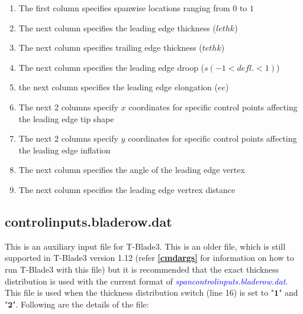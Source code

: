 \documentclass[8pt]{article}
\begin{document}
\begin{itemize}[leftmargin=*]
\begin{enumerate}[label=\alph*]
        \item The first column specifies spanwise locations ranging from $0$ to $1$
        \item The next column specifies the leading edge thickness ($lethk$)
        \item The next column specifies trailing edge thickness ($tethk$)
        \item The next column specifies the leading edge droop ($s(-1<defl.<1)$)
        \item the next column specifies the leading edge elongation ($ee$)
        \item The next 2 columns specify $x$ coordinates for specific control points affecting the leading edge tip shape
        \item The next 2 columns specify $y$ coordinates for specific control points affecting the leading edge inflation
        \item The next column specifies the angle of the leading edge vertex 
        \item The next column specifies the leading edge vertrex distance
    \end{enumerate}
\end{itemize}

\subsection{controlinputs.bladerow.dat}\label{auxinput2}
\noindent
This is an auxiliary input file for T-Blade3. This is an older file, which is still supported in T-Blade3 version 1.12 (refer \textbf{\ref{cmdargs}} for information on how to run T-Blade3 with this file) but it is recommended that the exact thickness distribution is used with the current format of \textit{\textcolor{blue}{spancontrolinputs.bladerow.dat}}. This file is used when the thickness distribution switch (line 16) is set to "$\mathbf{1}$" and "$\mathbf{2}$". Following are the details of the file:
\end{document}

